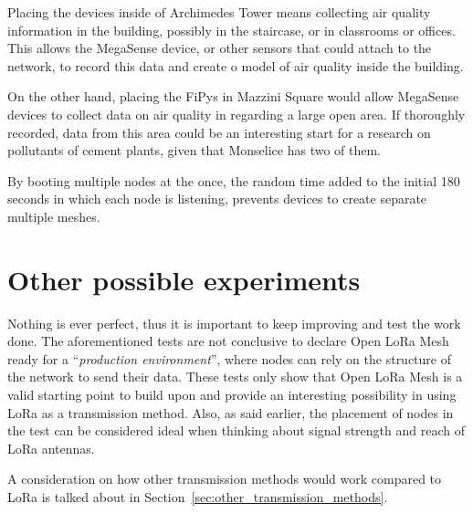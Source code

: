 		Placing the devices inside of Archimedes Tower means collecting air quality information in the building, possibly in the staircase, or in classrooms or offices.
		This allows the MegaSense device, or other sensors that could attach to the network, to record this data and create o model of air quality inside the building.
		
		On the other hand, placing the FiPys in Mazzini Square would allow MegaSense devices to collect data on air quality in regarding a large open area.
		If thoroughly recorded, data from this area could be an interesting start for a research on pollutants of 	cement plants, given that Monselice has two of them.
		
		By booting multiple nodes at the once, the random time added to the initial 180 seconds in which each node is listening, prevents devices to create separate multiple meshes.
	
	\section{Other possible experiments}
	
		Nothing is ever perfect, thus it is important to keep improving and test the work done.
		The aforementioned tests are not conclusive to declare Open LoRa Mesh ready for a ``\textit{production environment}'', where nodes can rely on the structure of the network to send their data.
		These tests only show that Open LoRa Mesh is a valid starting point to build upon and provide an interesting possibility in using LoRa as a transmission method.
		Also, as said earlier, the placement of nodes in the test can be considered ideal when thinking about signal strength and reach of LoRa antennas.
		
		A consideration on how other transmission methods would work compared to LoRa is talked about in Section~\ref{sec:other_transmission_methods}.